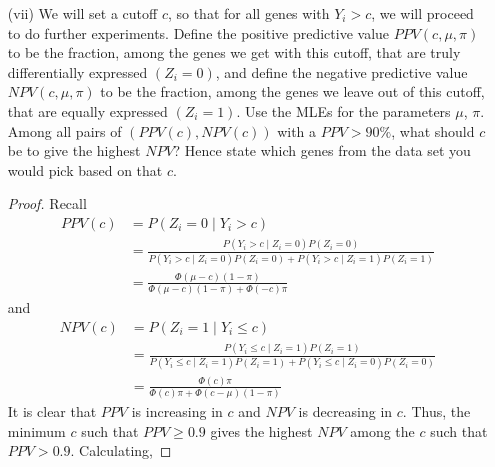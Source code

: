 \documentclass[letterpaper, 12pt]{article}\usepackage[]{graphicx}\usepackage[]{color}
\makeatletter
\newcommand{\hlnum}[1]{\textcolor[rgb]{0.686,0.059,0.569}{#1}}%
\newcommand{\hlopt}[1]{\textcolor[rgb]{0,0,0}{#1}}%
\newcommand{\hlstd}[1]{\textcolor[rgb]{0.345,0.345,0.345}{#1}}%
\newcommand{\hlkwb}[1]{\textcolor[rgb]{0.69,0.353,0.396}{#1}}%
\newcommand{\hlkwd}[1]{\textcolor[rgb]{0.737,0.353,0.396}{\textbf{#1}}}%
\newenvironment{kframe}{%
 \def\at@end@of@kframe{}%
 \ifinner\ifhmode%
  \def\at@end@of@kframe{\end{minipage}}%
  \begin{minipage}{\columnwidth}%
 \fi\fi%
 \def\FrameCommand##1{\hskip\@totalleftmargin \hskip-\fboxsep
 \colorbox{shadecolor}{##1}\hskip-\fboxsep
     \hskip-\linewidth \hskip-\@totalleftmargin \hskip\columnwidth}%
 \MakeFramed {\advance\hsize-\width
   \@totalleftmargin\z@ \linewidth\hsize
   \@setminipage}}%
 {\par\unskip\endMakeFramed%
 \at@end@of@kframe}
\newenvironment{knitrout}{}{} %
\makeatother
\begin{document}
\begin{enumerate}
\begin{enumerate}
\begin{proof}
\begin{knitrout}
\begin{kframe}
\begin{alltt}
\hlstd{lb3} \hlkwb{<-} \hlnum{1}\hlopt{/}\hlstd{(}\hlnum{1} \hlopt{+} \hlkwd{exp}\hlstd{(logit_pi_hat} \hlopt{+} \hlkwd{qnorm}\hlstd{(}\hlnum{0.975}\hlstd{)} \hlopt{*} \hlstd{logit_pi_sd))}
\hlstd{ub3} \hlkwb{<-} \hlnum{1}\hlopt{/}\hlstd{(}\hlnum{1} \hlopt{+} \hlkwd{exp}\hlstd{(logit_pi_hat} \hlopt{+} \hlkwd{qnorm}\hlstd{(}\hlnum{0.025}\hlstd{)} \hlopt{*} \hlstd{logit_pi_sd))}
\hlkwd{c}\hlstd{(lb3, ub3)}
\end{alltt}
\begin{verbatim}
## [1] 0.04412 0.09677
\end{verbatim}
\end{kframe}
\end{knitrout}

Hence an approximate 95\% confidence interval for $1-\pi$ is
\[
[0.0441, 0.0968]
\]
\end{proof}
\item[(vii)]
We will set a cutoff $c$, so that for all genes with $Y_i > c$, we will proceed to do further experiments. Define the positive predictive value $PPV(c, \mu, \pi)$ to be the fraction, among the genes we get with this cutoff, that are truly differentially expressed $(Z_i = 0)$, and define the negative predictive value $NPV(c, \mu, \pi)$ to be the fraction, among the genes we leave out of this cutoff, that are equally expressed $(Z_i = 1)$.
Use the MLEs for the parameters $\mu$, $\pi$. Among all pairs of $(PPV(c), NPV(c))$ with a $PPV> 90\%$, what should $c$ be to give the highest $NPV$? Hence state which genes from the data set you would pick based on that $c$.
\begin{proof}
Recall
\begin{align*}
PPV(c) &= P(Z_i = 0 \mid Y_i > c)
\\
&=
\frac{P(Y_i > c \mid Z_i = 0) P(Z_i = 0)}{P(Y_i > c \mid Z_i = 0) P(Z_i = 0)+P(Y_i > c \mid Z_i = 1) P(Z_i = 1)}
\\
&=
\frac{\Phi(\mu - c)(1-\pi)}{\Phi(\mu - c)(1-\pi) + \Phi(-c)\pi}
\end{align*}
and
\begin{align*}
NPV(c) &= P(Z_i = 1 \mid Y_i \leq c)
\\
&=
\frac{P(Y_i \leq c \mid Z_i = 1) P(Z_i = 1)}{P(Y_i \leq c \mid Z_i = 1) P(Z_i = 1)+P(Y_i \leq c \mid Z_i = 0) P(Z_i = 0)}
\\
&=
\frac{\Phi(c)\pi}{\Phi(c)\pi+\Phi(c -\mu)(1-\pi)}
\end{align*}
It is clear that $PPV$ is increasing in $c$ and $NPV$ is decreasing in $c$. Thus, the minimum $c$ such that $PPV \geq 0.9$ gives the highest $NPV$ among the $c$ such that $PPV > 0.9$. Calculating,

\end{proof}
\end{enumerate}
\end{enumerate}
\end{document}
